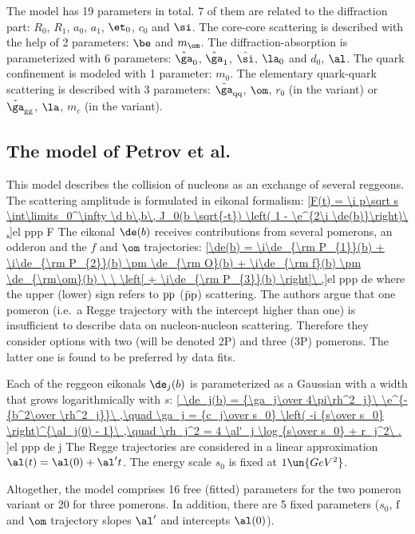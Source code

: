 The model has 19 parameters in total. 7 of them are related to the diffraction part: $R_0$, $R_1$, $a_0$, $a_1$, $\et_0$, $c_0$ and $\si$. The core-core scattering is described with the help of 2 parameters: $\be$ and $m_\om$. The diffraction-absorption is parameterized with 6 parameters: $\hat\ga_0$, $\hat\ga_1$, $\hat\si$, $\la_0$ and $d_0$, $\al$. The quark confinement is modeled with 1 parameter: $m_0$. The elementary quark-quark scattering is described with 3 parameters: $\tilde\ga_{\rm qq}$, $\om$, $r_0$ (in the  variant) or $\tilde\ga_{\rm gg}$, $\la$, $m_c$ (in the  variant).



\subsection{The model of Petrov et al.}

This model  describes the collision of nucleons as an exchange of several reggeons. The scattering amplitude is formulated in eikonal formalism:
\eqref{F(t) = \i p\sqrt s \int\limits_0^\infty \d b\,b\, J_0(b \sqrt{-t}) \left( 1 - \e^{2\i \de(b)}\right)\ .}{el ppp F}
The eikonal $\de(b)$ receives contributions from several pomerons, an odderon and the $f$ and $\om$ trajectories:
\eqref{\de(b) = \i\de_{\rm P_{1}}(b) + \i\de_{\rm P_{2}}(b) \pm \de_{\rm O}(b) + \i\de_{\rm f}(b) \pm \de_{\rm\om}(b) \ \  \left[ + \i\de_{\rm P_{3}}(b) \right]\ ,}{el ppp de}
where the upper (lower) sign refers to $\rm pp$ ($\rm \bar pp$) scattering. The authors argue that one pomeron (i.e.~a Regge trajectory with the intercept higher than one) is insufficient to describe data on nucleon-nucleon scattering. Therefore they consider options with two (will be denoted 2P) and three (3P) pomerons. The latter one is found to be preferred by data fits.

Each of the reggeon eikonals $\de_j(b)$ is parameterized as a Gaussian with a width that grows logarithmically with $s$:
\eqref{
	\de_j(b) = {\ga_j\over 4\pi\rh^2_j}\ \e^{-{b^2\over \rh^2_j}}\ ,\quad
	\ga_j = {c_j\over s_0} \left( -i {s\over s_0} \right)^{\al_j(0) - 1}\ ,\quad
	\rh_j^2 = 4 \al'_j \log {s\over s_0} + r_j^2\ .
}{el ppp de j}
The Regge trajectories are considered in a linear approximation $\al(t) = \al(0) + \al' t$. The energy scale $s_0$ is fixed at $1\un{GeV^2}$.

Altogether, the model comprises 16 free (fitted) parameters for the two pomeron variant or 20 for three pomerons. In addition, there are 5 fixed parameters ($s_0$, $\rm f$ and $\om$ trajectory slopes $\al'$ and intercepts $\al(0)$).



